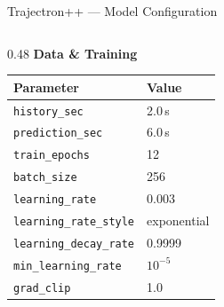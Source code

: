\begin{frame}[noframenumbering]{Trajectron++ — Model Configuration}
  \scriptsize
  \renewcommand{\arraystretch}{1.0}
  \begin{columns}[T]
    \begin{column}{0.48\textwidth}
      \textbf{Data \& Training}\\[0.15em]
      \begin{tabular}{@{}ll@{}}
        \toprule
        Parameter & Value \\
        \midrule
        \texttt{history\_sec}         & 2.0\,s \\
        \texttt{prediction\_sec}      & 6.0\,s \\
        \texttt{train\_epochs}        & 12 \\
        \texttt{batch\_size}          & 256 \\
        \texttt{learning\_rate}       & 0.003 \\
        \texttt{learning\_rate\_style}& exponential \\
        \texttt{learning\_decay\_rate}& 0.9999 \\
        \texttt{min\_learning\_rate}  & $10^{-5}$ \\
        \texttt{grad\_clip}           & 1.0 \\
        \bottomrule
      \end{tabular}


\end{column}
\end{columns}
\end{frame}
